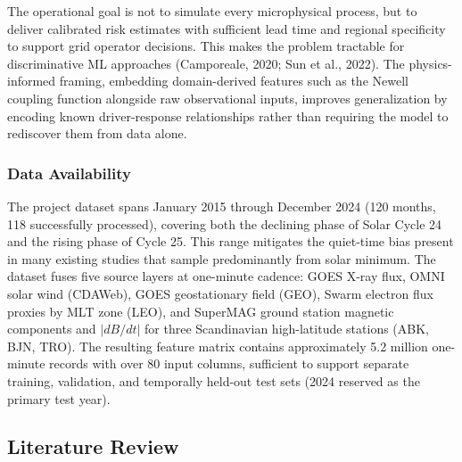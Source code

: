 \documentclass{article}
\begin{document}
\noindent The operational goal is not to simulate every microphysical process, but to deliver calibrated risk estimates with sufficient lead time and regional specificity to support grid operator decisions. This makes the problem tractable for discriminative ML approaches (Camporeale, 2020; Sun et al., 2022). The physics-informed framing, embedding domain-derived features such as the Newell coupling function alongside raw observational inputs, improves generalization by encoding known driver-response relationships rather than requiring the model to rediscover them from data alone.

\subsubsection*{Data Availability}
The project dataset spans January 2015 through December 2024 (120 months, 118 successfully processed), covering both the declining phase of Solar Cycle 24 and the rising phase of Cycle 25. This range mitigates the quiet-time bias present in many existing studies that sample predominantly from solar minimum. The dataset fuses five source layers at one-minute cadence: GOES X-ray flux, OMNI solar wind (CDAWeb), GOES geostationary field (GEO), Swarm electron flux proxies by MLT zone (LEO), and SuperMAG ground station magnetic components and $|dB/dt|$ for three Scandinavian high-latitude stations (ABK, BJN, TRO). The resulting feature matrix contains approximately 5.2 million one-minute records with over 80 input columns, sufficient to support separate training, validation, and temporally held-out test sets (2024 reserved as the primary test year).

\subsection*{Literature Review}
\end{document}
